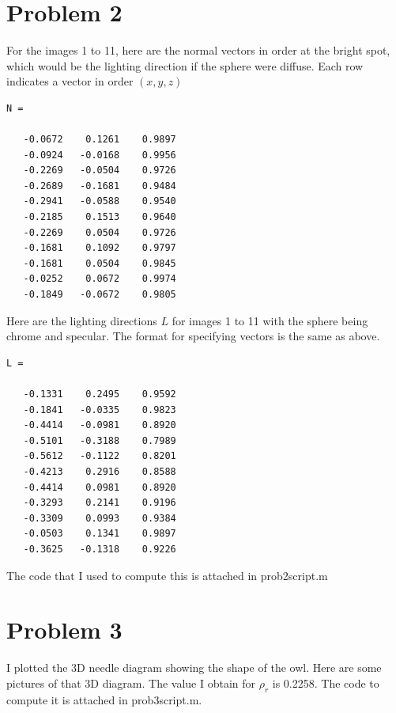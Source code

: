 \documentclass[11pt,psfig]{article}
\begin{document}
\section*{Problem 2}

For the images 1 to 11, here are the normal vectors in order at the bright spot, which would be the lighting direction if the sphere were diffuse. Each row indicates a vector in order $(x,y,z)$ 
\begin{verbatim}
N =

   -0.0672    0.1261    0.9897
   -0.0924   -0.0168    0.9956
   -0.2269   -0.0504    0.9726
   -0.2689   -0.1681    0.9484
   -0.2941   -0.0588    0.9540
   -0.2185    0.1513    0.9640
   -0.2269    0.0504    0.9726
   -0.1681    0.1092    0.9797
   -0.1681    0.0504    0.9845
   -0.0252    0.0672    0.9974
   -0.1849   -0.0672    0.9805
\end{verbatim}

Here are the lighting directions $L$ for images 1 to 11 with the sphere being chrome and specular. The format for specifying vectors is the same as above.

\begin{verbatim}
L =

   -0.1331    0.2495    0.9592
   -0.1841   -0.0335    0.9823
   -0.4414   -0.0981    0.8920
   -0.5101   -0.3188    0.7989
   -0.5612   -0.1122    0.8201
   -0.4213    0.2916    0.8588
   -0.4414    0.0981    0.8920
   -0.3293    0.2141    0.9196
   -0.3309    0.0993    0.9384
   -0.0503    0.1341    0.9897
   -0.3625   -0.1318    0.9226
\end{verbatim}

The code that I used to compute this is attached in prob2script.m

\newpage

\section*{Problem 3}

I plotted the 3D needle diagram showing the shape of the owl. Here are some pictures of that 3D diagram. The value I obtain for $\rho_r$ is 0.2258. The code to compute it is attached in prob3script.m.
\end{document}

